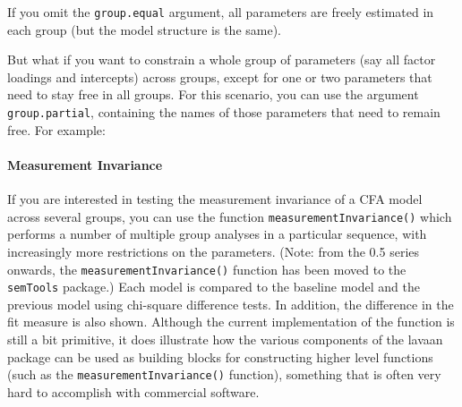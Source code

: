 If you omit the \texttt{group.equal} argument, all parameters are freely
estimated in each group (but the model structure is the same).

But what if you want to constrain a whole group of parameters (say all
factor loadings and intercepts) across groups, except for one or two
parameters that need to stay free in all groups. For this scenario, you
can use the argument \texttt{group.partial}, containing the names of
those parameters that need to remain free. For example:

\begin{Shaded}
\begin{Highlighting}[]
\StringTok{ }
            \NormalTok{,}
            \NormalTok{(}\NormalTok{, }\NormalTok{),}
            \NormalTok{(}\NormalTok{, }\NormalTok{))}
\end{Highlighting}
\end{Shaded}

\hypertarget{measurement-invariance}{%
\paragraph{Measurement Invariance}\label{measurement-invariance}}

If you are interested in testing the measurement invariance of a CFA
model across several groups, you can use the function
\texttt{measurementInvariance()} which performs a number of multiple
group analyses in a particular sequence, with increasingly more
restrictions on the parameters. (Note: from the 0.5 series onwards, the
\texttt{measurementInvariance()} function has been moved to the
\texttt{semTools} package.) Each model is compared to the baseline model
and the previous model using chi-square difference tests. In addition,
the difference in the fit measure is also shown. Although the current
implementation of the function is still a bit primitive, it does
illustrate how the various components of the lavaan package can be used
as building blocks for constructing higher level functions (such as the
\texttt{measurementInvariance()} function), something that is often very
hard to accomplish with commercial software.

\begin{Shaded}
\begin{Highlighting}[]
                       \NormalTok{)}
\end{Highlighting}
\end{Shaded}

